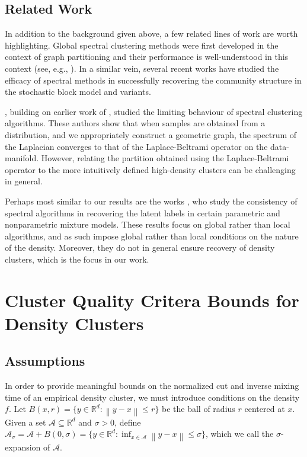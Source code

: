 \documentclass{article}
\newcommand{\Reals}{\mathbb{R}}
\newcommand{\Rd}{\Reals^d}
\newcommand{\norm}[1]{\left\lVert#1\right\rVert}
\newcommand{\1}{\mathbf{1}}
\newcommand{\Aset}{\mathcal{A}}
\newcommand{\Asig}{\Aset_{\sigma}}
\theoremstyle{aldenthm}
\theoremstyle{aldenrmrk}
\begin{document}
\subsection{Related Work}

In addition to the background given above, a few related lines of work are worth
highlighting. Global spectral clustering methods were first developed in the
context of graph partitioning \citep{fiedler1973,donath1973} and their
performance is well-understood in this context (see, e.g.,
\citealt{tolliver2006,luxburg2007}).  In a similar vein, several recent works
\citep{mcsherry2001,rohe2011,kamalika2012,balakrishnan2011,lei2015,abbe2018} 
have studied the efficacy of spectral methods in successfully recovering the
community structure in the stochastic block model and variants.

\citet{vonluxburg2008,hein2005}, building on earlier work of
\citet{koltchinskii2000}, studied the limiting behaviour of spectral clustering
algorithms. These authors show that when samples are obtained from a
distribution, and we appropriately construct a geometric graph, the spectrum of
the Laplacian converges to that of the Laplace-Beltrami operator on the
data-manifold. However, relating the partition obtained using the
Laplace-Beltrami operator to the more intuitively defined high-density
clusters can be challenging in general.

Perhaps most similar to our results are the works
\citet{vempala2004,shi2009,schiebinger2015}, who study the consistency of
spectral algorithms in recovering the latent labels in certain parametric and
nonparametric mixture models. These results focus on global rather than local
algorithms, and as such impose global rather than local conditions on the nature
of the density. Moreover, they do not in general ensure recovery of density
clusters, which is the focus in our work. 

\section{Cluster Quality Critera Bounds for Density Clusters}  
\label{sec: PhiPsi}

\subsection{Assumptions}

In order to provide meaningful bounds on the normalized cut and inverse mixing
time of an empirical density cluster, we must introduce conditions on the
density $f$. Let $B(x,r) = \{y \in \Rd: \norm{y - x} \leq r\}$ be the ball of
radius $r$ centered at $x$.  Given a set $\Aset \subseteq \Rd$ and $\sigma > 0$,
define $\Asig = \Aset + B(0,\sigma) = \{y \in \Rd: \inf_{x \in \Aset} \norm{y - 
    x} \leq \sigma\}$, which we call the $\sigma$-expansion of $\Aset$. 
\end{document}
